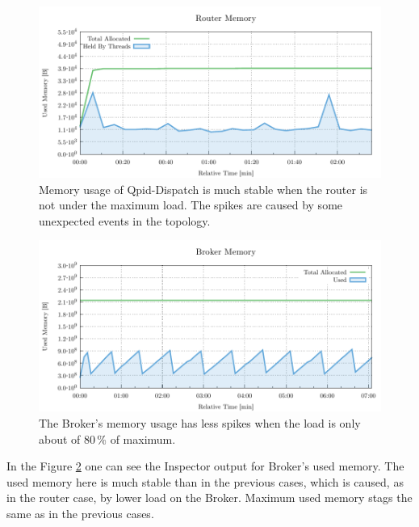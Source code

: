 \begin{figure}[H]
	\centering
	\includegraphics[width=1\linewidth]{obrazky-figures/charts/singlepoint-router-latency-memory.pdf}
	\caption{Memory usage of Qpid-Dispatch is much stable when the router is not under the maximum load. The spikes are caused by some unexpected events in the topology.}
	\label{fig:latency-single-router-memory}
\end{figure}


\begin{figure}[H]
	\centering
	\includegraphics[width=1\linewidth]{obrazky-figures/charts/singlepoint-broker-latency-memory.pdf}
	\caption{The Broker's memory usage has less spikes when the load is only about of 80\,\% of maximum.}
	\label{fig:latency-single-broker-memory}
\end{figure}

In the Figure \ref{fig:latency-single-broker-memory} one can see the Inspector output for Broker's used memory. The used memory here is much stable than in the previous cases, which is caused, as in the router case, by lower load on the Broker. Maximum used memory stags the same as in the previous cases.

